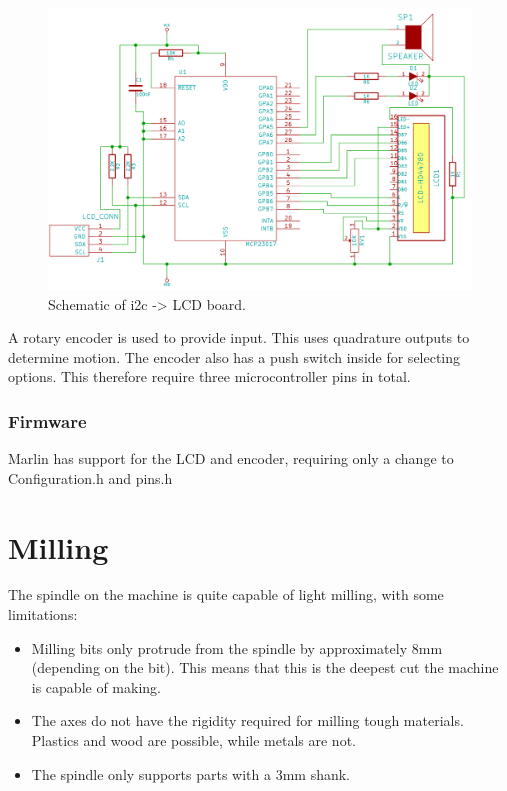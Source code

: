 \documentclass[a4paper,11pt]{article}  %
\begin{document}
\begin{figure}[ht!]
\centering
\includegraphics[width=160mm]{resources/lcd_backpack.png}
\caption{Schematic of i2c -> LCD board.}
\label{lcd_backpack}
\end{figure}

A rotary encoder is used to provide input. This uses quadrature outputs to determine motion. The encoder also has a push switch inside for selecting options. This therefore require three microcontroller
pins in total.

\subsubsection{Firmware}
Marlin has support for the LCD and encoder, requiring only a change to Configuration.h and pins.h


\section{Milling}
The spindle on the machine is quite capable of light milling, with some limitations:

\begin{itemize} \itemsep0em
	\item	Milling bits only protrude from the spindle by approximately 8mm (depending on the bit). This means that this is the deepest cut the machine is capable of making.
	\item	The axes do not have the rigidity required for milling tough materials. Plastics and wood are possible, while metals are not.
	\item	The spindle only supports parts with a 3mm shank.
\end{itemize}
\end{document}
